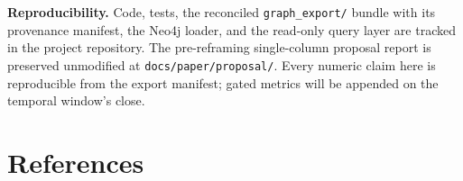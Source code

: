 \documentclass[10pt,twocolumn,letterpaper]{article}
\begin{document}
\vspace{1ex}
\noindent\textbf{Reproducibility.} Code, tests, the reconciled
\texttt{graph\_export/} bundle with its provenance manifest, the Neo4j
loader, and the read-only query layer are tracked in the project repository.
The pre-reframing single-column proposal report is preserved unmodified at
\texttt{docs/paper/proposal/}. Every numeric claim here is reproducible
from the export manifest; gated metrics will be appended on the temporal
window's close.

\section*{References}
\end{document}

